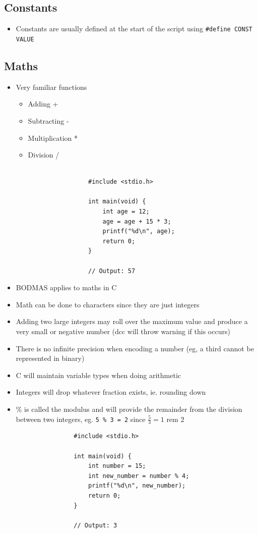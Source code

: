 \documentclass{article}
\begin{document}
	\subsection{Constants}
		\begin{itemize}
			\item Constants are usually defined at the start of the script using \texttt{#define CONST VALUE}
		\end{itemize}

	\subsection{Maths}
		\begin{itemize}
			\item Very familiar functions
				\begin{itemize}
					\item Adding +
					\item Subtracting -
					\item Multiplication *
					\item Division /
				\end{itemize}

				\begin{verbatim}

					#include <stdio.h>

					int main(void) {
						int age = 12;
						age = age + 15 * 3;
						printf("%d\n", age);
						return 0;
					}

					// Output: 57
				\end{verbatim}

			\item BODMAS applies to maths in C
			\item Math can be done to characters since they are just integers
			\item Adding two large integers may roll over the maximum value and produce a very small or negative number (dcc will throw warning if this occurs)
			\item There is no infinite precision when encoding a number (eg, a third cannot be represented in binary)
			\item C will maintain variable types when doing arithmetic
			\item Integers will drop whatever fraction exists, ie. rounding down
			\item \% is called the modulus and will provide the remainder from the division between two integers, eg. \verb+5 % 3 = 2+ since $\frac{5}{3} = 1 \text{ rem } 2$

			\begin{verbatim}
				#include <stdio.h>

				int main(void) {
					int number = 15;
					int new_number = number % 4;
					printf("%d\n", new_number);
					return 0;
				}

				// Output: 3
			\end{verbatim}
		\end{itemize}
\end{document}

